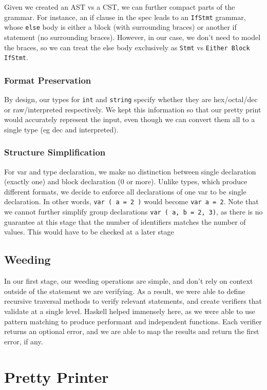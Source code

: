 \documentclass[11pt]{article}
\begin{document}
Given we created an AST vs a CST, we can further compact parts of
the grammar. For instance, an if clause in the spec leads to an
\texttt{IfStmt} grammar, whose \texttt{else} body is either a block (with
surrounding braces) or another if statement (no surrounding
braces). However, in our case, we don't need to model the braces,
so we can treat the else body exclusively as \texttt{Stmt} vs \texttt{Either
    Block IfStmt}.
\subsubsection{Format Preservation}
\label{sec:org899f7a6}
By design, our types for \texttt{int} and \texttt{string} specify whether they
are hex/octal/dec or raw/interpreted respectively. We kept this
information so that our pretty print would accurately represent
the input, even though we can convert them all to a single type
(eg dec and interpreted).
\subsubsection{Structure Simplification}
\label{sec:orgbde0cd8}
For var and type declaration, we make no distinction between
single declaration (exactly one) and block declaration (0 or
more). Unlike types, which produce different formats, we decide to
enforce all declarations of one var to be single declaration. In
other words, \texttt{var ( a = 2 )} would become \texttt{var a = 2}. Note that
we cannot further simplify group declarations \texttt{var ( a, b = 2,
    3)}, as there is no guarantee at this stage that the number of
identifiers matches the number of values. This would have to be
checked at a later stage
\subsection{Weeding}
\label{sec:org0aa9e52}
In our first stage, our weeding operations are simple, and don't rely 
on context outside of the statement we are verifying. As a result, 
we were able to define recursive traversal methods to verify relevant 
statements, and create verifiers that validate at a single level.
Haskell helped immensely here, as we were able to use pattern matching 
to produce performant and independent functions.
Each verifier returns an optional error, and we are able to map the results 
and return the first error, if any.
\section{Pretty Printer}
\label{sec:org115d519}
\end{document}
